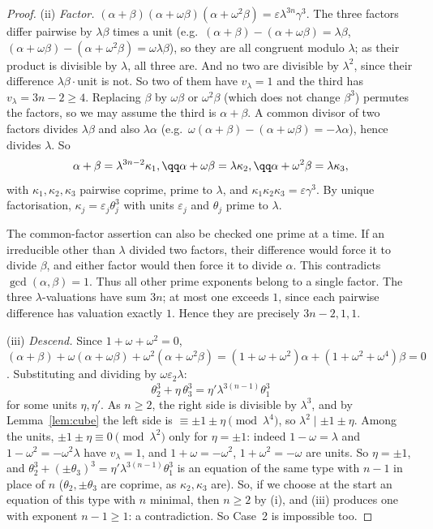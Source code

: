\begin{proof}
(ii) \emph{Factor.} $(\alpha+\beta)(\alpha+\omega\beta)(\alpha+\omega^2\beta)=\varepsilon\lambda^{3n}\gamma^3$. The three factors differ pairwise by $\lambda\beta$ times a unit (e.g.\ $(\alpha+\beta)-(\alpha+\omega\beta)=\lambda\beta$, $(\alpha+\omega\beta)-(\alpha+\omega^2\beta)=\omega\lambda\beta$), so they are all congruent modulo $\lambda$; as their product is divisible by $\lambda$, all three are. And no two are divisible by $\lambda^2$, since their difference $\lambda\beta\cdot$unit is not. So two of them have $v_\lambda=1$ and the third has $v_\lambda=3n-2\ge4$. Replacing $\beta$ by $\omega\beta$ or $\omega^2\beta$ (which does not change $\beta^3$) permutes the factors, so we may assume the third is $\alpha+\beta$. A common divisor of two factors divides $\lambda\beta$ and also $\lambda\alpha$ (e.g.\ $\omega(\alpha+\beta)-(\alpha+\omega\beta)=-\lambda\alpha$), hence divides $\lambda$. So
\[
\begin{gathered}\alpha+\beta=\lambda^{3n-2}\kappa_1,\qq\alpha+\omega\beta=\lambda\kappa_2,\qq\alpha+\omega^2\beta=\lambda\kappa_3,\end{gathered}
\]
with $\kappa_1,\kappa_2,\kappa_3$ pairwise coprime, prime to $\lambda$, and $\kappa_1\kappa_2\kappa_3=\varepsilon\gamma^3$. By unique factorisation, $\kappa_j=\varepsilon_j\theta_j^3$ with units $\varepsilon_j$ and $\theta_j$ prime to $\lambda$.

The common-factor assertion can also be checked one prime at a time.
If an irreducible other than $\lambda$ divided two factors, their
difference would force it to divide $\beta$, and either factor would
then force it to divide $\alpha$. This contradicts
$\gcd(\alpha,\beta)=1$. Thus all other prime exponents belong to a
single factor. The three $\lambda$-valuations have sum $3n$;
at most one exceeds $1$, since each pairwise difference has valuation
exactly $1$. Hence they are precisely $3n-2,1,1$.

(iii) \emph{Descend.} Since $1+\omega+\omega^2=0$,
$(\alpha+\beta)+\omega(\alpha+\omega\beta)+\omega^2(\alpha+\omega^2\beta)=(1+\omega+\omega^2)\alpha+(1+\omega^2+\omega^4)\beta=0$. Substituting and dividing by $\omega\varepsilon_2\lambda$:
\[
\theta_2^3+\eta\,\theta_3^3=\eta'\lambda^{3(n-1)}\theta_1^3
\]
for some units $\eta,\eta'$. As $n\ge2$, the right side is divisible by $\lambda^3$, and by Lemma~\ref{lem:cube} the left side is $\equiv\pm1\pm\eta\pmod{\lambda^4}$, so $\lambda^2\mid\pm1\pm\eta$. Among the units, $\pm1\pm\eta\equiv0\pmod{\lambda^2}$ only for $\eta=\pm1$: indeed $1-\omega=\lambda$ and $1-\omega^2=-\omega^2\lambda$ have $v_\lambda=1$, and $1+\omega=-\omega^2$, $1+\omega^2=-\omega$ are units. So $\eta=\pm1$, and $\theta_2^3+(\pm\theta_3)^3=\eta'\lambda^{3(n-1)}\theta_1^3$ is an equation of the same type with $n-1$ in place of $n$ ($\theta_2,\pm\theta_3$ are coprime, as $\kappa_2,\kappa_3$ are). So, if we choose at the start an equation of this type with $n$ minimal, then $n\ge2$ by (i), and (iii) produces one with exponent $n-1\ge1$: a contradiction. So Case~2 is impossible too.
\end{proof}

